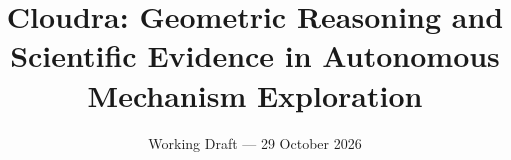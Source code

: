 \documentclass[10pt,twocolumn,a4paper]{article}
\title{Cloudra: Geometric Reasoning and Scientific Evidence in Autonomous Mechanism Exploration}
\author{}
\date{\small Working Draft --- 29 October 2026}
\makeatletter
\numberwithin{equation}{section}
\renewcommand{\maketitle}{%
  \twocolumn[{\centering
    {\LARGE\bfseries\@title\par}\vspace{0.6em}
    {\small\@date\par}\vspace{1.2em}}]%
}
\makeatother
\begin{document}
\maketitle
\nocite{ref01,ref02,ref03,ref04,ref05,ref06,ref07,ref08,ref09,ref10,ref11,ref12,ref13,ref14,ref15,ref16,ref17,ref18}

\FloatBarrier

\FloatBarrier



\end{document}
